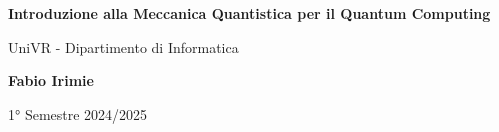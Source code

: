 \begin{titlepage}
	\begin{center}
		\vspace*{1cm}

		\Huge
		\textbf{Introduzione alla Meccanica Quantistica per il Quantum Computing}

		\vspace{0.5cm}
		\LARGE
		UniVR - Dipartimento di Informatica

		\vspace{1.5cm}

		\textbf{Fabio Irimie}

		\vfill


		\vspace{0.8cm}


		1° Semestre 2024/2025

	\end{center}
\end{titlepage}
